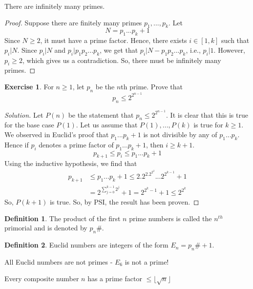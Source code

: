 \documentclass[12pt,letterpaper]{amsbook}
\theoremstyle{definition}
\newtheorem{definition}{Definition} %
\newtheorem*{exercise}{Exercise}
\newenvironment{solution}
  {\renewcommand\qedsymbol{$\blacksquare$}\begin{proof}[Solution]}
  {\end{proof}}
\begin{document}
\begin{theorem}[Euclid]
  There are infinitely many primes.  
\end{theorem}

\begin{proof}
  Suppose there are finitely many primes $p_1,...,p_k$. Let
  \[N = p_1...p_k + 1\]
  Since $N \geq 2$, it must have a prime factor. Hence, there exists $i \in [1,k]$ such that $p_i | N$. Since $p_i|N$ and $p_i|p_1p_2...p_k$, we get that $p_i|N-p_1p_2...p_k$, i.e., $p_i|1$. However, $p_i \geq 2$, which gives us a contradiction. So, there must be infinitely many primes.
\end{proof}

\begin{exercise}
  For $n \geq 1$, let $p_n$ be the $n$th prime. Prove that
  \[p_n \leq 2^{2^{n-1}}\]
\end{exercise}

\begin{solution}
  Let $P(n)$ be the statement that $p_n \leq 2^{2^{n-1}}$. It is clear that this is true for the base case $P(1)$. Let us assume that $P(1),...,P(k)$ is true for $k \geq 1$.
  We observed in Euclid's proof that $p_1...p_k+1$ is not divisible by any of $p_1...p_k$. Hence if $p_i$ denotes a prime factor of $p_1...p_k+1$, then $i \geq k+1$.
  \[p_{k+1} \leq p_i \leq p_1...p_k+1\]
  Using the inductive hypothesis, we find that
  \begin{align*}
    p_{k+1} &\leq p_1...p_k+1 \leq 2.2^2.2^{2^2}...2^{2^{k-1}}+1 \\
            &= 2^{\sum_{j=0}^{k-1} 2^j}+1 = 2^{2^k-1}+1 \leq 2^{2^k}
  \end{align*}
  So, $P(k+1)$ is true. So, by PSI, the result has been proven.
\end{solution}

\begin{definition}
  The product of the first $n$ prime numbers is called the $n^{th}$ primorial and is denoted by $p_n\#$.
\end{definition}

\begin{definition}
  Euclid numbers are integers of the form $E_n = p_n\# +1$. 
\end{definition}

All Euclid numbers are not primes - $E_6$ is not a prime!

\begin{theorem}
  Every composite number $n$ has a prime factor $\leq \lfloor \sqrt{n} \rfloor$
\end{theorem}
\end{document}
